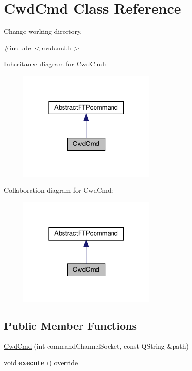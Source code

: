 \hypertarget{classCwdCmd}{}\section{Cwd\+Cmd Class Reference}
\label{classCwdCmd}


Change working directory.  




{\ttfamily \#include $<$cwdcmd.\+h$>$}



Inheritance diagram for Cwd\+Cmd\+:\nopagebreak
\begin{figure}[H]
\begin{center}
\leavevmode
\includegraphics[width=195pt]{df/d02/classCwdCmd__inherit__graph}
\end{center}
\end{figure}


Collaboration diagram for Cwd\+Cmd\+:\nopagebreak
\begin{figure}[H]
\begin{center}
\leavevmode
\includegraphics[width=195pt]{de/dbf/classCwdCmd__coll__graph}
\end{center}
\end{figure}
\subsection*{Public Member Functions}
\begin{DoxyCompactItemize}
\item 
\hyperlink{classCwdCmd_a625256040d74b4fec013d3a17119dc21}{Cwd\+Cmd} (int command\+Channel\+Socket, const Q\+String \&path)
\item 
\mbox{\label{classCwdCmd_a39189ee40036d7f44290973787dc06e1}} 
void {\bfseries execute} () override
\end{DoxyCompactItemize}
